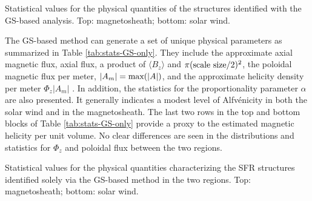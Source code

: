 \begin{table}
    \centering
    \caption[Statistical values for the physical quantities of structures identified with GS-based analysis analysis]{Statistical values for the physical quantities of the structures identified with the GS-based analysis. Top: magnetosheath; bottom: solar wind.}
    
    \label{tab:stats-GS}
\end{table}

The GS-based method can generate a set of unique physical parameters \citep{Hu:2017} as summarized in Table \ref{tab:stats-GS-only}. They include the approximate axial magnetic flux, \gls{axial flux}, a product of $\langle B_z\rangle$ and $\pi(\textnormal{scale size}/2)^2$, the poloidal magnetic flux per meter, $|A_m| = \textnormal{max}(|A|)$, and the approximate helicity density per meter $\Phi_z|A_m|$ \citep{Hu:2014}. In addition, the statistics for the proportionality parameter $\alpha$ are also presented. It generally indicates a modest level of Alfv\'enicity in both the solar wind and in the magnetosheath. The last two rows in the top and bottom blocks of Table \ref{tab:stats-GS-only} provide a proxy to the estimated magnetic helicity per unit volume. No clear differences are seen in the distributions and statistics for $\Phi_z$ and \gls{poloidal flux} between the two regions.
\begin{table}[ht!]
    \caption[Statistical values for the physical quantities of SFR structures identified solely via the GS-based method]{Statistical values for the physical quantities characterizing the SFR structures identified solely via the GS-based method in the two regions. Top: magnetosheath; bottom: solar wind.}
    \centering
    
    \label{tab:stats-GS-only}
\end{table}


